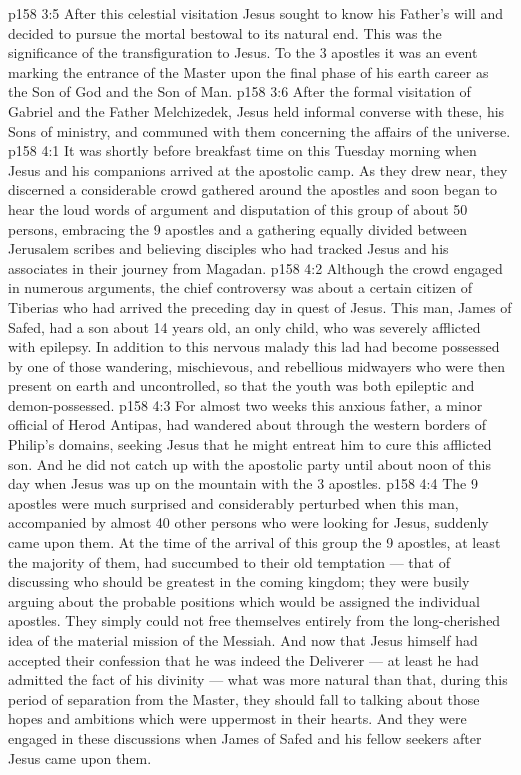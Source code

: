 \vs p158 3:5 After this celestial visitation Jesus sought to know his Father’s will and decided to pursue the mortal bestowal to its natural end. This was the significance of the transfiguration to Jesus. To the 3 apostles it was an event marking the entrance of the Master upon the final phase of his earth career as the Son of God and the Son of Man.
\vs p158 3:6 After the formal visitation of Gabriel and the Father Melchizedek, Jesus held informal converse with these, his Sons of ministry, and communed with them concerning the affairs of the universe.
\vs p158 4:1 It was shortly before breakfast time on this Tuesday morning when Jesus and his companions arrived at the apostolic camp. As they drew near, they discerned a considerable crowd gathered around the apostles and soon began to hear the loud words of argument and disputation of this group of about 50 persons, embracing the 9 apostles and a gathering equally divided between Jerusalem scribes and believing disciples who had tracked Jesus and his associates in their journey from Magadan.
\vs p158 4:2 Although the crowd engaged in numerous arguments, the chief controversy was about a certain citizen of Tiberias who had arrived the preceding day in quest of Jesus. This man, James of Safed, had a son about 14 years old, an only child, who was severely afflicted with epilepsy. In addition to this nervous malady this lad had become possessed by one of those wandering, mischievous, and rebellious midwayers who were then present on earth and uncontrolled, so that the youth was both epileptic and demon\hyp{}possessed.
\vs p158 4:3 For almost two weeks this anxious father, a minor official of Herod Antipas, had wandered about through the western borders of Philip’s domains, seeking Jesus that he might entreat him to cure this afflicted son. And he did not catch up with the apostolic party until about noon of this day when Jesus was up on the mountain with the 3 apostles.
\vs p158 4:4 The 9 apostles were much surprised and considerably perturbed when this man, accompanied by almost 40 other persons who were looking for Jesus, suddenly came upon them. At the time of the arrival of this group the 9 apostles, at least the majority of them, had succumbed to their old temptation --- that of discussing who should be greatest in the coming kingdom; they were busily arguing about the probable positions which would be assigned the individual apostles. They simply could not free themselves entirely from the long\hyp{}cherished idea of the material mission of the Messiah. And now that Jesus himself had accepted their confession that he was indeed the Deliverer --- at least he had admitted the fact of his divinity --- what was more natural than that, during this period of separation from the Master, they should fall to talking about those hopes and ambitions which were uppermost in their hearts. And they were engaged in these discussions when James of Safed and his fellow seekers after Jesus came upon them.
